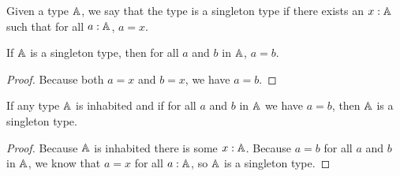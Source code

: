 \documentclass[../math.tex]{subfiles}
\begin{document}
\begin{class}
    Given a type $\mathbb{A}$, we say that the type is a singleton type if there exists
    an $x : \mathbb{A}$ such that for all $a : \mathbb{A}$, $a = x$.
\end{class}

\begin{theorem}
    If $\mathbb{A}$ is a singleton type, then for all $a$ and $b$ in $\mathbb{A}$, $a = b$.
\end{theorem}
\begin{proof}
    Because both $a = x$ and $b = x$, we have $a = b$.
\end{proof}

\begin{theorem}
    If any type $\mathbb{A}$ is inhabited and if for all $a$ and $b$ in $\mathbb{A}$ we have $a
    = b$, then $\mathbb{A}$ is a singleton type.
\end{theorem}
\begin{proof}
    Because $\mathbb{A}$ is inhabited there is some $x : \mathbb{A}$.  Because $a = b$ for all
    $a$ and $b$ in $\mathbb{A}$, we know that $a = x$ for all $a : \mathbb{A}$, so $\mathbb{A}$ is a
    singleton type.
\end{proof}
\end{document}
